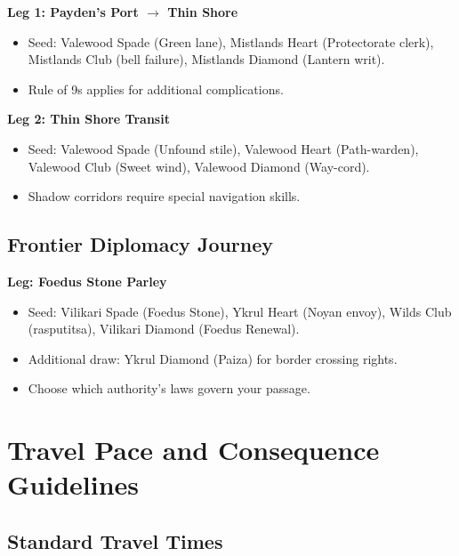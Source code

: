 \textbf{Leg 1: Payden's Port $\rightarrow$ Thin Shore}
\begin{itemize}
\item Seed: Valewood Spade (Green lane), Mistlands Heart (Protectorate clerk), Mistlands Club (bell failure), Mistlands Diamond (Lantern writ).
\item Rule of 9s applies for additional complications.
\end{itemize}

\textbf{Leg 2: Thin Shore Transit}
\begin{itemize}
\item Seed: Valewood Spade (Unfound stile), Valewood Heart (Path-warden), Valewood Club (Sweet wind), Valewood Diamond (Way-cord).
\item Shadow corridors require special navigation skills.
\end{itemize}

\subsection{Frontier Diplomacy Journey}
\label{subsec:frontier-diplomacy}

\textbf{Leg: Foedus Stone Parley}
\begin{itemize}
\item Seed: Vilikari Spade (Foedus Stone), Ykrul Heart (Noyan envoy), Wilds Club (rasputitsa), Vilikari Diamond (Foedus Renewal).
\item Additional draw: Ykrul Diamond (Paiza) for border crossing rights.
\item Choose which authority's laws govern your passage.
\end{itemize}

\section{Travel Pace and Consequence Guidelines}
\label{sec:pace-consequences}

\subsection{Standard Travel Times}
\label{subsec:travel-times}

